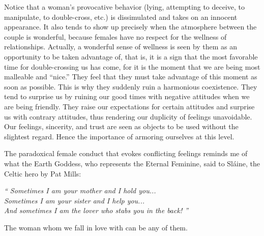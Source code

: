 \par Notice that a woman's provocative behavior (lying, attempting to deceive, to manipulate, to double-cross, etc.) is dissimulated and takes on an innocent appearance. It also tends to show up precisely when the atmosphere between the couple is wonderful, because females have no respect for the wellness of relationships. Actually, a wonderful sense of wellness is seen by them as an opportunity to be taken advantage of, that is, it is a sign that the most favorable time for double-crossing us has come, for it is the moment that we are being most malleable and \enquote{nice.} They feel that they must take advantage of this moment as soon as possible. This is why they suddenly ruin a harmonious coexistence. They tend to surprise us by ruining our good times with negative attitudes when we are being friendly. They raise our expectations for certain attitudes and surprise us with contrary attitudes, thus rendering our duplicity of feelings unavoidable. Our feelings, sincerity, and trust are seen as objects to be used without the slightest regard. Hence the importance of armoring ourselves at this level.


\par The paradoxical female conduct that evokes conflicting feelings reminds me of what the Earth Goddess, who represents the Eternal Feminine, said to Sláine, the Celtic hero by Pat Mills:

\begin{center}
\textit{\enquote{%
Sometimes I am your mother and I hold you...\\%
\hfill \break%
Sometimes I am your sister and I help you...\\%
\hfill \break%
And sometimes I am the lover who stabs you in the back!%
}}
\end{center}

\par The woman whom we fall in love with can be any of them.
